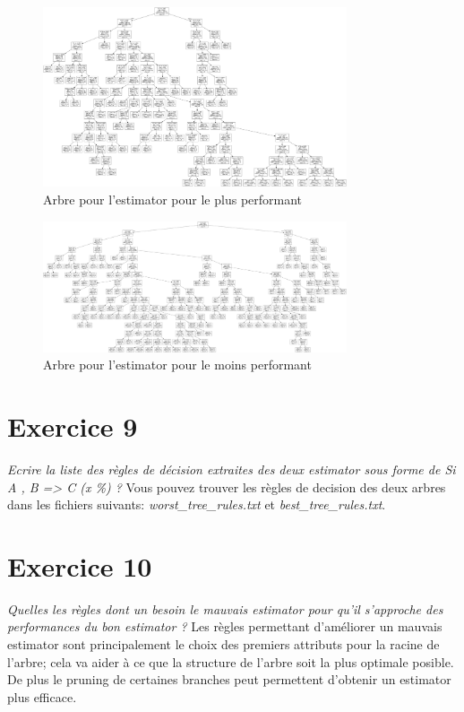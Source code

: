 \documentclass[a4paper, 12pt, oneside]{book}
\begin{document}
  \begin{figure}[H]
    \centering
    \includegraphics[width=0.8\textwidth]{images/best_tree}
    \caption{Arbre pour l'estimator pour le plus performant}
    \label{fig:intro-home}
  \end{figure}


  \begin{figure}[H]
    \centering
    \includegraphics[width=0.8\textwidth]{images/worst_tree}
    \caption{Arbre pour l'estimator pour le moins performant}
    \label{fig:intro-home}
  \end{figure}



\section{Exercice 9}
\textit{Ecrire la liste des règles de décision extraites des deux estimator sous forme de Si A , B => C (x \%) ?}
\newline \newline
Vous pouvez trouver les règles de decision des deux arbres dans les fichiers suivants: \textit{worst\_tree\_rules.txt} et \textit{best\_tree\_rules.txt}.

\section{Exercice 10}
\textit{Quelles les règles dont un besoin le mauvais estimator pour qu'il s'approche des performances du bon estimator ?}
\newline \newline
Les règles permettant d'améliorer un mauvais estimator sont principalement le choix des premiers attributs pour la racine de l'arbre; cela va aider à ce que la structure de l'arbre soit la plus optimale posible. De plus le pruning de certaines branches peut permettent d'obtenir un estimator plus efficace.



\end{document}
